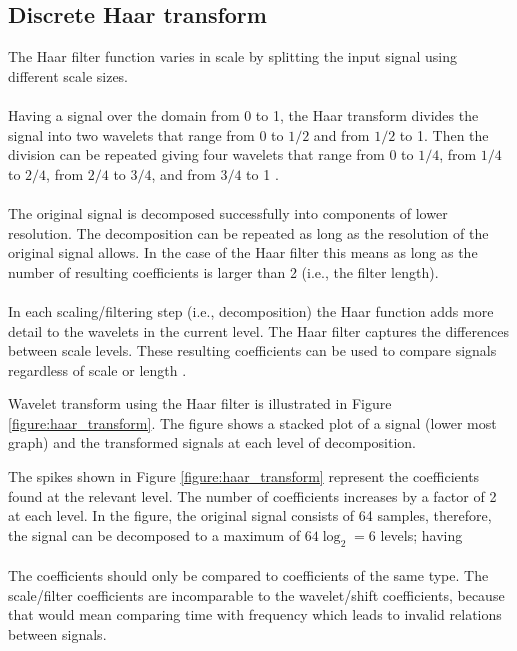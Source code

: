 \subsection{Discrete Haar transform}
The Haar filter function varies in scale by splitting the input signal using
different scale sizes.

\paragraph{}
Having a signal over the domain from 0 to 1, the Haar transform divides the
signal into two wavelets that range from 0 to $1/2$ and from $1/2$ to 1. Then
the division can be repeated giving four wavelets that range from 0 to $1/4$,
from $1/4$ to $2/4$, from $2/4$ to $3/4$, and from $3/4$ to 1 \cite{graps}.

\paragraph{}
The original signal is decomposed successfully into components of lower
resolution. The decomposition can be repeated as long as the resolution of
the original signal allows. In the case of the Haar filter this means as long
as the number of resulting coefficients is larger than 2 (i.e., the filter
length).

\paragraph{}
In each scaling/filtering step (i.e., decomposition) the Haar function adds
more detail to the wavelets in the current level. The Haar filter captures the
differences between scale levels. These resulting coefficients can be used to
compare signals regardless of scale or length \cite{graps}.

Wavelet transform using the Haar filter is illustrated in Figure
\ref{figure:haar_transform}. The figure shows a stacked plot of a signal
(lower most graph) and the transformed signals at each level of decomposition.



The spikes shown in Figure \ref{figure:haar_transform} represent the
coefficients found at the relevant level. The number of coefficients increases
by a factor of 2 at each level. In the figure, the original signal consists of
64 samples, therefore, the signal can be decomposed to a maximum of $64 \log_{2}
= 6$ levels; having 

\paragraph{}
The coefficients should only be compared to coefficients of the same type. The
scale/filter coefficients are incomparable to the wavelet/shift coefficients,
because that would mean comparing time with frequency which leads to invalid
relations between signals.

